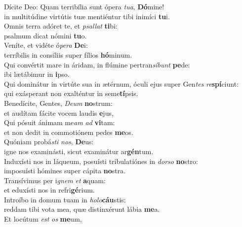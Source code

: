 \evenverse Dícite Deo: Quam terribília sunt ópera \textit{tu}\textit{a}, \textbf{Dó}mine!~\*\\
\evenverse in multitúdine virtútis tuæ mentiéntur tibi inimíci \textbf{tu}i.\\
\oddverse Omnis terra adóret te, et \textit{psal}\textit{lat} \textbf{ti}bi:~\*\\
\oddverse psalmum dicat nómini \textbf{tu}o.\\
\evenverse Veníte, et vidéte ó\textit{pe}\textit{ra} \textbf{De}i:~\*\\
\evenverse terríbilis in consíliis super fílios \textbf{hó}minum.\\
\oddverse Qui convértit mare in áridam, in flúmine pertran\textit{sí}\textit{bunt} \textbf{pe}de:~\*\\
\oddverse ibi lætábimur in \textbf{i}pso.\\
\evenverse Qui dominátur in virtúte sua in ætérnum, óculi ejus super Gen\textit{tes} \textit{re}\textbf{spí}ciunt:~\*\\
\evenverse qui exásperant non exalténtur in seme\textbf{tí}psis.\\
\oddverse Benedícite, Gentes, \textit{De}\textit{um} \textbf{no}strum:~\*\\
\oddverse et audítam fácite vocem laudis \textbf{e}jus,\\
\evenverse Qui pósuit ánimam me\textit{am} \textit{ad} \textbf{vi}tam:~\*\\
\evenverse et non dedit in commotiónem pedes \textbf{me}os.\\
\oddverse Quóniam probá\textit{sti} \textit{nos}, \textbf{De}us:~\*\\
\oddverse igne nos examinásti, sicut examinátur ar\textbf{gén}tum.\\
\evenverse Induxísti nos in láqueum, posuísti tribulatiónes in \textit{dor}\textit{so} \textbf{no}stro:~\*\\
\evenverse imposuísti hómines super cápita \textbf{no}stra.\\
\oddverse Transívimus per i\textit{gnem} \textit{et} \textbf{a}quam:~\*\\
\oddverse et eduxísti nos in refri\textbf{gé}rium.\\
\evenverse Introíbo in domum tuam in \textit{ho}\textit{lo}\textbf{cáu}stis:~\*\\
\evenverse reddam tibi vota mea, quæ distinxérunt lábia \textbf{me}a.\\
\oddverse Et locútum \textit{est} \textit{os} \textbf{me}um,~\*\\
